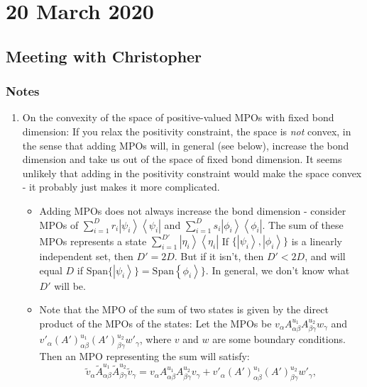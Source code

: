 \documentclass{report}
\begin{document}
\chapter{20 March 2020}

\section{Meeting with Christopher}

\subsection{Notes}

\begin{enumerate}
\item On the convexity of the space of positive-valued MPOs with fixed bond dimension: If you relax the positivity constraint, the space is \textit{not} convex, in the sense that adding MPOs will, in general (see below), increase the bond dimension and take us out of the space of fixed bond dimension. It seems unlikely that adding in the positivity constraint would make the space convex - it probably just makes it more complicated.
	\begin{itemize}
	\item Adding MPOs does not always increase the bond dimension - consider MPOs of $\sum_{i=1}^{D}r_i\left|\psi_i\right>\left<\psi_i\right|$ and $\sum_{i=1}^{D}s_i\left|\phi_i\right>\left<\phi_i\right|$. The sum of these MPOs represents a state $\sum_{i=1}^{D'}\left|\eta_i\right>\left<\eta_i\right|$ If $\{\left|\psi_i\right>,\left|\phi_i\right>\}$ is a linearly independent set, then $D'=2D$. But if it isn't, then $D'<2D$, and will equal $D$ if $\mathrm{Span}{\{\left|\psi_i\right>\}}=\mathrm{Span}{\left\{\phi_i\right>\}}$. In general, we don't know what $D'$ will be. 
	\item Note that the MPO of the sum of two states is given by the direct product of the MPOs of the states: Let the MPOs be $v_\alpha A_{\alpha\beta}^{u_1}A_{\beta\gamma}^{u_2}w_\gamma$ and $v'_\alpha (A')_{\alpha\beta}^{u_1}(A')_{\beta\gamma}^{u_2}w'_\gamma$, where $v$ and $w$ are some boundary conditions. Then an MPO representing the sum will satisfy:
	\begin{equation}\tilde v_\alpha \tilde A_{\alpha\beta}^{u_1}\tilde A_{\beta\gamma}^{u_2}\tilde v_\gamma=v_\alpha A_{\alpha\beta}^{u_1}A_{\beta\gamma}^{u_2}v_\gamma+v'_\alpha (A')_{\alpha\beta}^{u_1}(A')_{\beta\gamma}^{u_2}w'_\gamma,\end{equation}

\end{itemize}
\end{enumerate}
\end{document}

